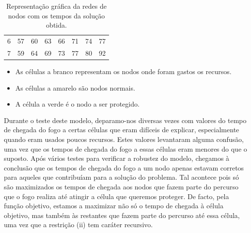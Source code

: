 \documentclass[11pt]{article} %
\begin{document}
\begin{table}[h]
\begin{tabular}{cccccccc}
\multicolumn{1}{c|}{6} & \multicolumn{1}{c|}{\cellcolor[HTML]{F8FF00}57} & \multicolumn{1}{c|}{\cellcolor[HTML]{F8FF00}60} & \multicolumn{1}{c|}{\cellcolor[HTML]{F8FF00}63} & \multicolumn{1}{c|}{\cellcolor[HTML]{F8FF00}66} & \multicolumn{1}{c|}{\cellcolor[HTML]{F8FF00}71} & \multicolumn{1}{c|}{\cellcolor[HTML]{F8FF00}74} & \multicolumn{1}{c|}{\cellcolor[HTML]{FFFFFF}77} \\ \cline{2-8}
\multicolumn{1}{c|}{7} & \multicolumn{1}{c|}{\cellcolor[HTML]{F8FF00}59} & \multicolumn{1}{c|}{\cellcolor[HTML]{F8FF00}64} & \multicolumn{1}{c|}{\cellcolor[HTML]{F8FF00}69} & \multicolumn{1}{c|}{\cellcolor[HTML]{F8FF00}73} & \multicolumn{1}{c|}{\cellcolor[HTML]{F8FF00}77} & \multicolumn{1}{c|}{\cellcolor[HTML]{FFFFFF}80} & \multicolumn{1}{c|}{\cellcolor[HTML]{32CB00}92} \\ \cline{2-8}
\end{tabular}
\caption{Representação gráfica da redes de nodos com os tempos da solução obtida.}
\end{table}
\begin{itemize}[$\ast$]
	\item As células a branco representam os nodos onde foram gastos os recursos.
    \item As células a amarelo são nodos normais.
    \item A célula a verde é o nodo a ser protegido.
\end{itemize}
\par Durante o teste deste modelo, deparamo-nos diversas vezes com valores do tempo de chegada do fogo a certas células que eram difíceis de explicar, especialmente quando eram usados poucos recursos. Estes valores levantaram alguma confusão, uma vez que os tempos de chegada do fogo a essas células eram menores do que o suposto. Após vários testes para verificar a robustez do modelo, chegamos à conclusão que os tempos de chegada do fogo a um nodo apenas estavam corretos para aqueles que contribuíam para a solução do problema. Tal acontece pois só são maximizados os tempos de chegada aos nodos que fazem parte do percurso que o fogo realiza até atingir a célula que queremos proteger. De facto, pela função objetivo, estamos a maximizar não só o tempo de chegada à célula objetivo, mas também às restantes que fazem parte do percurso até essa célula, uma vez que a restrição (ii) tem caráter recursivo.
\end{document}
